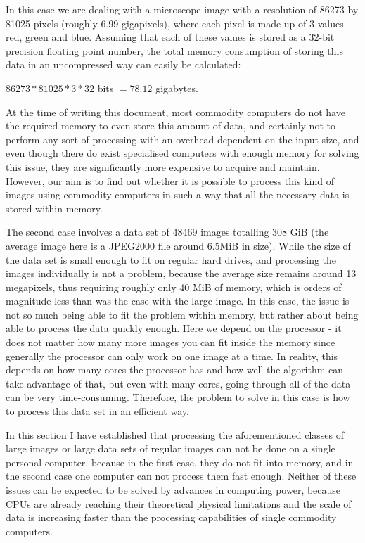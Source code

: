 \documentclass [12pt,a4paper]{report}
\begin{document}
In this case we are dealing with a microscope image with a resolution of 86273 by 81025 pixels (roughly 6.99 gigapixels), where each pixel is made up of 3 values - red, green and blue. Assuming that each of these values is stored as a 32-bit precision floating point number, the total memory consumption of storing this data in an uncompressed way can easily be calculated:

\begin{center}
$ 86273 * 81025 * 3 * 32$ bits $ = 78.12 $ gigabytes.
\end{center}

At the time of writing this document, most commodity computers do not have the required memory to even store this amount of data, and certainly not to perform any sort of processing with an overhead dependent on the input size, and even though there do exist specialised computers with enough memory for solving this issue, they are significantly more expensive to acquire and maintain. However, our aim is to find out whether it is possible  to process this kind of images using commodity computers in such a way that all the necessary data is stored within memory.

The second case involves a data set of 48469 images totalling 308 GiB (the average image here is a JPEG2000 file around 6.5MiB in size). While the size of the data set is small enough to fit on regular hard drives, and processing the images individually is not a problem, because the average size remains around 13 megapixels, thus requiring roughly only 40 MiB of memory, which is orders of magnitude less than was the case with the large image. In this case, the issue is not so much being able to fit the problem within memory, but rather about being able to process the data quickly enough. Here we depend on the processor - it does not matter how many more images you can fit inside the memory since generally the processor can only work on one image at a time. In reality, this depends on how many cores the processor has and how well the algorithm can take advantage of that, but even with many cores, going through all of the data can be very time-consuming. Therefore, the problem to solve in this case is how to process this data set in an efficient way.

In this section I have established that processing the aforementioned classes of large images or large data sets of regular images can not be done on a single personal computer, because in the first case, they do not fit into memory, and in the second case one computer can not process them fast enough. Neither of these issues can be expected to be solved by advances in computing power, because CPUs are already reaching their theoretical physical limitations  and the scale of data is increasing faster than the processing capabilities of single commodity computers. 
\end{document}
